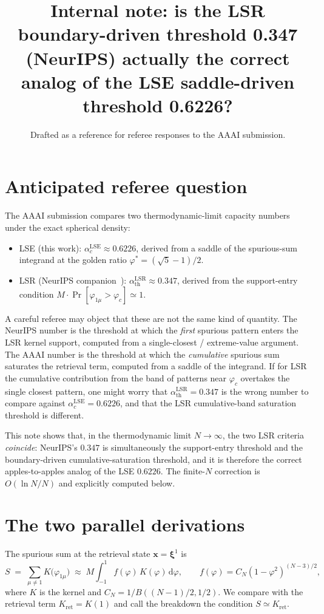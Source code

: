\documentclass[11pt]{article}
\title{\bfseries Internal note: is the LSR boundary-driven threshold
0.347 (NeurIPS) actually the correct analog of the LSE saddle-driven
threshold 0.6226?}
\author{}
\date{Drafted as a reference for referee responses to the AAAI submission.}
\newcommand{\bxi}{\boldsymbol{\xi}}
\newcommand{\bx}{\bm{x}}
\newcommand{\athLSR}{\alpha_{\mathrm{th}}^{\mathrm{LSR}}}
\newcommand{\acLSE}{\alpha_c^{\mathrm{LSE}}}
\begin{document}
\maketitle

\section*{Anticipated referee question}

The AAAI submission compares two thermodynamic-limit capacity numbers
under the exact spherical density:
\begin{itemize}
  \item LSE (this work): $\acLSE \approx 0.6226$, derived from a saddle of
        the spurious-sum integrand at the golden ratio
        $\varphi^{*} = (\sqrt{5}-1)/2$.
  \item LSR (NeurIPS companion~\cite{petrova2026metastable}):
        $\athLSR \approx 0.347$, derived from the support-entry condition
        $M \cdot \Pr[\varphi_{1\mu} > \varphi_c] \simeq 1$.
\end{itemize}
A careful referee may object that these are not the same kind of quantity.
The NeurIPS number is the threshold at which the \emph{first} spurious
pattern enters the LSR kernel support, computed from a single-closest /
extreme-value argument. The AAAI number is the threshold at which the
\emph{cumulative} spurious sum saturates the retrieval term, computed from
a saddle of the integrand. If for LSR the cumulative contribution from the
band of patterns near $\varphi_c$ overtakes the single closest pattern,
one might worry that $\athLSR = 0.347$ is the wrong number to compare
against $\acLSE = 0.6226$, and that the LSR cumulative-band saturation
threshold is different.

This note shows that, in the thermodynamic limit $N \to \infty$, the two
LSR criteria \emph{coincide}: NeurIPS's $0.347$ is simultaneously the
support-entry threshold and the boundary-driven cumulative-saturation
threshold, and it is therefore the correct apples-to-apples analog of the
LSE $0.6226$. The finite-$N$ correction is $O(\ln N / N)$ and explicitly
computed below.

\section{The two parallel derivations}

The spurious sum at the retrieval state $\bx = \bxi^1$ is
\begin{equation}
S \;=\; \sum_{\mu \neq 1} K\bigl(\varphi_{1\mu}\bigr)
   \;\approx\; M \int_{-1}^{1} f(\varphi)\,K(\varphi)\,\mathrm{d}\varphi,
\qquad f(\varphi) = C_N(1-\varphi^2)^{(N-3)/2},
\label{eq:S}
\end{equation}
where $K$ is the kernel and $C_N = 1/B((N-1)/2, 1/2)$. We compare with
the retrieval term $K_{\mathrm{ret}} = K(1)$ and call the breakdown the
condition $S \simeq K_{\mathrm{ret}}$.
\end{document}
